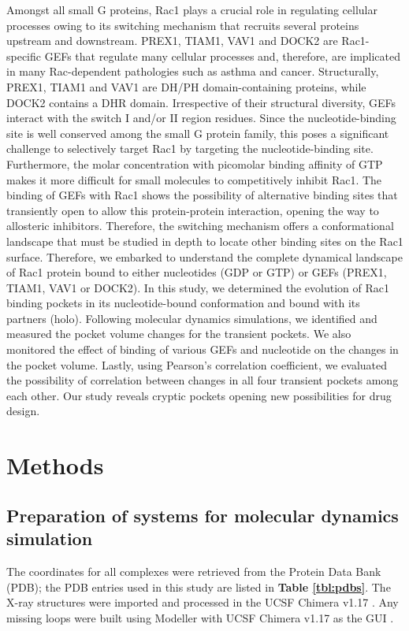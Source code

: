 \documentclass[12pt, a4paper]{achemso}
\begin{document}
Amongst all small G proteins, Rac1 plays a crucial role in regulating cellular processes owing to its switching mechanism that recruits several proteins upstream and downstream. PREX1, TIAM1, VAV1 and DOCK2 are Rac1-specific GEFs that regulate many cellular processes and, therefore, are implicated in many Rac-dependent pathologies such as asthma and cancer.  Structurally, PREX1, TIAM1 and VAV1 are DH/PH domain-containing proteins, while DOCK2 contains a DHR domain. Irrespective of their structural diversity, GEFs interact with the switch I and/or II region residues.  Since the nucleotide-binding site is well conserved among the small G protein family, this poses a significant challenge to selectively target Rac1 by targeting the nucleotide-binding site. Furthermore, the molar concentration with picomolar binding affinity of GTP makes it more difficult for small molecules to competitively inhibit Rac1. The binding of GEFs with Rac1 shows the possibility of alternative binding sites that transiently open to allow this protein-protein interaction, opening the way to allosteric inhibitors. Therefore, the switching mechanism offers a conformational landscape that must be studied in depth to locate other binding sites on the Rac1 surface. Therefore, we embarked to understand the complete dynamical landscape of Rac1 protein bound to either nucleotides (GDP or GTP) or GEFs (PREX1, TIAM1, VAV1 or DOCK2). In this study, we determined the evolution of Rac1 binding pockets in its nucleotide-bound conformation and bound with its partners (holo). Following molecular dynamics simulations, we identified and measured the pocket volume changes for the transient pockets. We also monitored the effect of binding of various GEFs and nucleotide on the changes in the pocket volume. Lastly, using Pearson's correlation coefficient, we evaluated the possibility of correlation between changes in all four transient pockets among each other. Our study reveals cryptic pockets opening new possibilities for drug design.

\section{Methods}\label{methods}
\subsection{Preparation of systems for molecular dynamics simulation} 
The coordinates for all complexes were retrieved from the Protein Data Bank (PDB); the PDB entries used in this study are listed in \textbf{Table \ref{tbl:pdbs}}. The X-ray structures were imported and processed in the UCSF Chimera v1.17 \cite{pettersen2004ucsf}. Any missing loops were built using Modeller \cite{fiser2003modeller} with  UCSF Chimera v1.17 as the GUI \cite{yang2012ucsf, huang2014enhancing}. 
\end{document}

